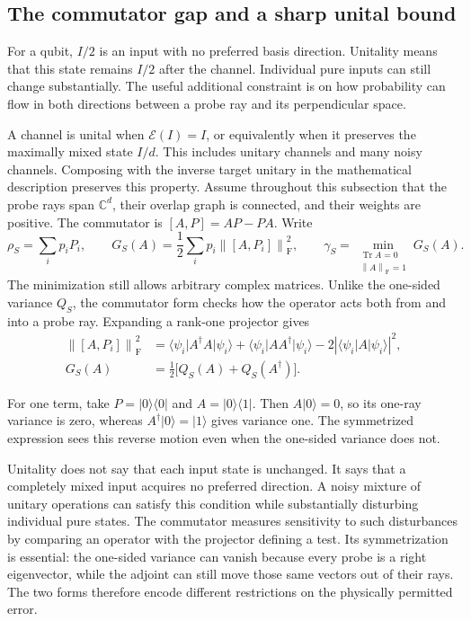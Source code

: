 \documentclass[11pt,a4paper]{article}
\newcommand{\ket}[1]{\lvert #1\rangle}
\newcommand{\bra}[1]{\langle #1\rvert}
\newcommand{\Tr}{\operatorname{Tr}}
\newcommand{\normF}[1]{\left\lVert #1\right\rVert_{\mathrm F}}
\numberwithin{equation}{section}
\begin{document}
\subsection{The commutator gap and a sharp unital bound}

For a qubit, $I/2$ is an input with no preferred basis direction. Unitality
means that this state remains $I/2$ after the channel. Individual pure inputs
can still change substantially. The useful additional constraint is on
how probability can flow in both directions between a probe ray and its
perpendicular space.

A channel is unital when $\mathcal E(I)=I$, or equivalently when it preserves the maximally mixed state $I/d$. This includes unitary channels and many noisy channels. Composing with the inverse target unitary in the mathematical description preserves this property. Assume throughout this subsection that the probe rays span $\mathbb C^d$, their overlap graph is connected, and their weights are positive. The commutator is $[A,P]=AP-PA$. Write
\[
 \rho_S=\sum_i p_iP_i,
 \qquad
 G_S(A)=\frac12\sum_i p_i\normF{[A,P_i]}^2,
 \qquad
 \gamma_S=\min_{\substack{\Tr A=0\\\normF{A}=1}}G_S(A).
\]
The minimization still allows arbitrary complex matrices. Unlike the one-sided variance $Q_S$, the commutator form checks how the operator acts both from and into a probe ray. Expanding a rank-one projector gives
\begin{align*}
 \normF{[A,P_i]}^2
 &=\bra{\psi_i}A^\dagger A\ket{\psi_i}
  +\bra{\psi_i}AA^\dagger\ket{\psi_i}
  -2\left|\bra{\psi_i}A\ket{\psi_i}\right|^2,\\
 G_S(A)&=\tfrac12\bigl[Q_S(A)+Q_S(A^\dagger)\bigr].
\end{align*}

For one term, take $P=\ket0\bra0$ and $A=\ket0\bra1$.
Then $A\ket0=0$, so its one-ray variance is zero, whereas
$A^\dagger\ket0=\ket1$ gives variance one. The symmetrized expression
sees this reverse motion even when the one-sided variance does not.

Unitality does not say that each input state is unchanged. It says that a completely mixed input acquires no preferred direction. A noisy mixture of unitary operations can satisfy this condition while substantially disturbing individual pure states. The commutator measures sensitivity to such disturbances by comparing an operator with the projector defining a test. Its symmetrization is essential: the one-sided variance can vanish because every probe is a right eigenvector, while the adjoint can still move those same vectors out of their rays. The two forms therefore encode different restrictions on the physically permitted error.
\end{document}
